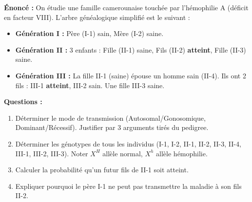 \documentclass[11pt]{article}
\begin{document}
\begin{exoresolu}
    \textbf{Énoncé :} On étudie une famille camerounaise touchée par l'hémophilie A (déficit en facteur VIII). L'arbre généalogique simplifié est le suivant :
    \begin{itemize}
        \item \textbf{Génération I :} Père (I-1) sain, Mère (I-2) saine.
        \item \textbf{Génération II :} 3 enfants : Fille (II-1) saine, Fils (II-2) \textbf{atteint}, Fille (II-3) saine.
        \item \textbf{Génération III :} La fille II-1 (saine) épouse un homme sain (II-4). Ils ont 2 fils : III-1 \textbf{atteint}, III-2 sain. Une fille III-3 saine.
    \end{itemize}
    \textbf{Questions :}
    \begin{enumerate}
        \item Déterminer le mode de transmission (Autosomal/Gonosomique, Dominant/Récessif). Justifier par 3 arguments tirés du pedigree.
        \item Déterminer les génotypes de tous les individus (I-1, I-2, II-1, II-2, II-3, II-4, III-1, III-2, III-3). Noter $X^H$ allèle normal, $X^h$ allèle hémophilie.
        \item Calculer la probabilité qu'un futur fils de II-1 soit atteint.
        \item Expliquer pourquoi le père I-1 ne peut pas transmettre la maladie à son fils II-2.
    \end{enumerate}


\end{exoresolu}
\end{document}
